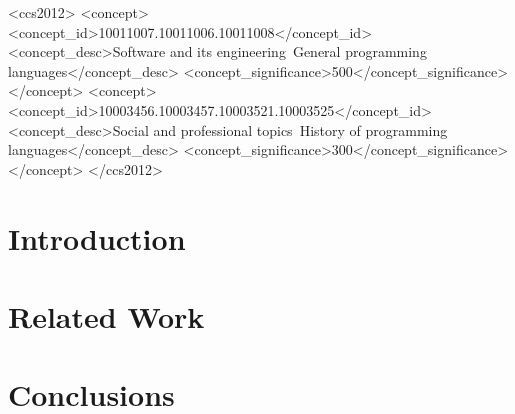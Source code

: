 \documentclass[sigplan,10pt,review,anonymous]{acmart}\settopmatter{printfolios=true}
\begin{document}
\begin{CCSXML}
<ccs2012>
<concept>
<concept_id>10011007.10011006.10011008</concept_id>
<concept_desc>Software and its engineering~General programming languages</concept_desc>
<concept_significance>500</concept_significance>
</concept>
<concept>
<concept_id>10003456.10003457.10003521.10003525</concept_id>
<concept_desc>Social and professional topics~History of programming languages</concept_desc>
<concept_significance>300</concept_significance>
</concept>
</ccs2012>
\end{CCSXML}





\maketitle

\section{Introduction}


\vspace{-10pt}
\section{Related Work}






\section{Conclusions}


{\footnotesize 
}


%
\end{document}
